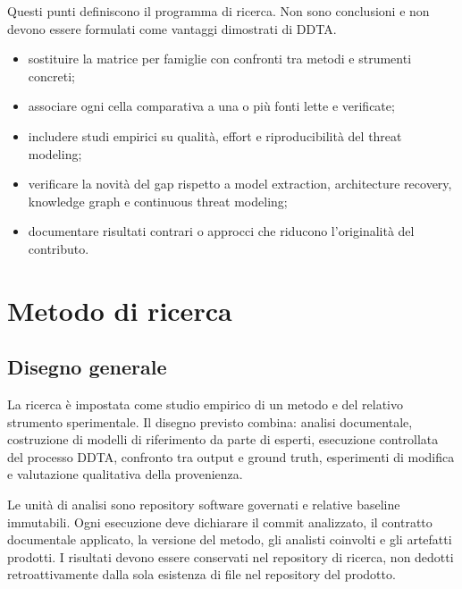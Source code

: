 \documentclass[12pt,a4paper,oneside]{report}
\newcommand{\statuslabel}[1]{\par\medskip\noindent{\Large\bfseries\sffamily #1}\par\medskip}
\begin{document}
\begin{epistemicnote}
Questi punti definiscono il programma di ricerca. Non sono conclusioni e non devono essere formulati come vantaggi dimostrati di DDTA.
\end{epistemicnote}

\statuslabel{DA COMPLETARE}

\begin{pendingnote}
\begin{itemize}
  \item sostituire la matrice per famiglie con confronti tra metodi e strumenti concreti;
  \item associare ogni cella comparativa a una o più fonti lette e verificate;
  \item includere studi empirici su qualità, effort e riproducibilità del threat modeling;
  \item verificare la novità del gap rispetto a model extraction, architecture recovery, knowledge graph e continuous threat modeling;
  \item documentare risultati contrari o approcci che riducono l'originalità del contributo.
\end{itemize}
\end{pendingnote}

\chapter{Metodo di ricerca}

\section{Disegno generale}

La ricerca è impostata come studio empirico di un metodo e del relativo strumento sperimentale. Il disegno previsto combina: analisi documentale, costruzione di modelli di riferimento da parte di esperti, esecuzione controllata del processo DDTA, confronto tra output e ground truth, esperimenti di modifica e valutazione qualitativa della provenienza.

Le unità di analisi sono repository software governati e relative baseline immutabili. Ogni esecuzione deve dichiarare il commit analizzato, il contratto documentale applicato, la versione del metodo, gli analisti coinvolti e gli artefatti prodotti. I risultati devono essere conservati nel repository di ricerca, non dedotti retroattivamente dalla sola esistenza di file nel repository del prodotto.
\end{document}
